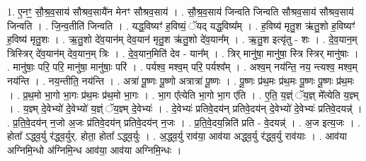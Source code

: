 \documentclass[17pt]{extarticle}
\begin{document}
1. ए॒नꣳ॒॒ सौ॒श्र॒व॒साय॑ सौश्रव॒सायै॑न मेनꣳ सौश्रव॒साय॑ । . सौ॒श्र॒व॒साय॑ जिन्वति जिन्वति सौश्रव॒साय॑ सौश्रव॒साय॑ जिन्वति । . जि॒न्व॒तीति॑ जिन्वति । . यद्ध॒विष्यꣳ॑ ह॒विष्यं॒ ॅयद् यद्ध॒विष्य᳚म् । . ह॒विष्य॑ मृतु॒श ऋ॑तु॒शो ह॒विष्यꣳ॑ ह॒विष्य॑ मृतु॒शः । . ऋ॒तु॒शो दे॑व॒यान॑म् देव॒यान॑ मृतु॒श ऋ॑तु॒शो दे॑व॒यान᳚म् । . ऋ॒तु॒श इत्यृ॑तु - शः । . दे॒व॒यान॒म् त्रिस्त्रिर् दे॑व॒यान॑म् देव॒यान॒म् त्रिः । . दे॒व॒यान॒मिति॑ देव - यान᳚म् । . त्रिर् मानु॑षा॒ मानु॑षा॒ स्त्रि स्त्रिर् मानु॑षाः । . मानु॑षाः॒ परि॒ परि॒ मानु॑षा॒ मानु॑षाः॒ परि॑ । . पर्यश्व॒ मश्व॒म् परि॒ पर्यश्व᳚म् । . अश्व॒म् नय॑न्ति॒ नय॒ न्त्यश्व॒ मश्व॒म् नय॑न्ति । . नय॒न्तीति॒ नय॑न्ति । . अत्रा॑ पू॒ष्णः पू॒ष्णो अत्रात्रा॑ पू॒ष्णः । . पू॒ष्णः प्र॑थ॒मः प्र॑थ॒मः पू॒ष्णः पू॒ष्णः प्र॑थ॒मः । . प्र॒थ॒मो भा॒गो भा॒गः प्र॑थ॒मः प्र॑थ॒मो भा॒गः । . भा॒ग ए᳚त्येति भा॒गो भा॒ग ए॑ति । . ए॒ति॒ य॒ज्ञ्ं ॅय॒ज्ञ् मे᳚त्येति य॒ज्ञ्म् । . य॒ज्ञ्म् दे॒वेभ्यो॑ दे॒वेभ्यो॑ य॒ज्ञ्ं ॅय॒ज्ञ्म् दे॒वेभ्यः॑ । . दे॒वेभ्यः॑ प्रतिवे॒दय॑न् प्रतिवे॒दय॑न् दे॒वेभ्यो॑ दे॒वेभ्यः॑ प्रतिवे॒दयन्न्॑ । . प्र॒ति॒वे॒दय॑न् न॒जो अ॒जः प्र॑तिवे॒दय॑न् प्रतिवे॒दय॑न् न॒जः । . प्र॒ति॒वे॒दय॒न्निति॑ प्रति - वे॒दयन्न्॑ । . अ॒ज इत्य॒जः । . होता᳚ ऽद्ध्व॒र्यु र॑द्ध्व॒र्युर्. होता॒ होता᳚ ऽद्ध्व॒र्युः । . अ॒द्ध्व॒र्यु राव॑या॒ आव॑या अद्ध्व॒र्यु र॑द्ध्व॒र्यु राव॑याः । . आव॑या अग्निमि॒न्धो अ॑ग्निमि॒न्ध आव॑या॒ आव॑या अग्निमि॒न्धः । \newline
\end{document}

